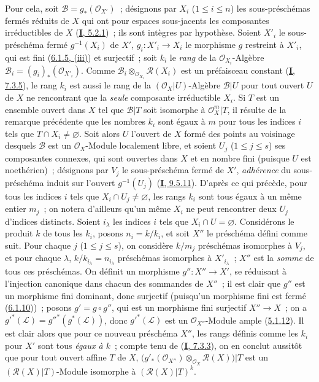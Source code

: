 Pour cela, soit $\mathcal{B}=g_*(\mathcal{O}_{X'})$~; désignons par $X_i$
($1\leq i\leq n$) les sous-préschémas fermés réduits de $X$ qui ont pour
espaces sous-jacents les composantes irréductibles de $X$
(\hyperref[I.5.2.1-fr]{\textbf{I}, 5.2.1})~; ils sont intègres par hypothèse. Soient
$X'_i$ le sous-préschéma fermé
$g^{-1}(X_i)$ de $X'$, $g_i:X'_i\to X_i$ le morphisme $g$ restreint à
$X'_i$, qui est fini (\hyperref[II.6.1.5-fr]{6.1.5, (iii)}) et surjectif~;
soit $k_i$ le \emph{rang} de la $\mathcal{O}_{X_i}$-Algèbre
$\mathcal{B}_i=(g_i)_*(\mathcal{O}_{X'_i})$. Comme
$\mathcal{B}_i\otimes_{\mathcal{O}_{X_i}}\mathcal{R}(X_i)$ est un
préfaisceau constant (\hyperref[I.7.3.5-fr]{\textbf{I}, 7.3.5}), le rang $k_i$ est
aussi le rang de la $(\mathcal{O}_X|U)$-Algèbre $\mathcal{B}|U$ pour tout
ouvert $U$ de $X$ ne rencontrant que la \emph{seule} composante irréductible
$X_i$. Si $T$ est un ensemble ouvert dans $X$ tel que $\mathcal{B}|T$ soit
isomorphe à $\mathcal{O}_X^m|T$, il résulte de la remarque précédente que les
nombres $k_i$ sont égaux à $m$ pour tous les indices $i$ tels que
$T\cap X_i\neq\varnothing$. Soit alors $U$ l'ouvert de $X$ formé des points
au voisinage desquels $\mathcal{B}$ est un $\mathcal{O}_X$-Module localement
libre, et soient $U_j$ ($1\leq j\leq s$) ses composantes connexes, qui sont
ouvertes dans $X$ et en nombre fini (puisque $U$ est noethérien)~; désignons
par $V_j$ le sous-préschéma fermé de $X'$, \emph{adhérence} du sous-préschéma
induit sur l'ouvert $g^{-1}(U_j)$
(\hyperref[I.9.5.11-fr]{\textbf{I}, 9.5.11}). D'après ce qui précède, pour tous les
indices $i$ tels que $X_i\cap U_j\neq\varnothing$, les rangs $k_i$ sont tous
égaux à un même entier $m_j$~; on notera d'ailleurs qu'un même $X_i$ ne peut
rencontrer deux $U_j$ d'indices distincts. Soient $i_\lambda$ les indices
$i$ tels que $X_i\cap U=\varnothing$. Considérons le produit $k$ de tous les
$k_i$, posons $n_i=k/k_i$, et soit $X''$ le préschéma défini comme suit.
Pour chaque $j$ ($1\leq j\leq s$), on considère $k/m_j$ préschémas
isomorphes à $V_j$, et pour chaque $\lambda$, $k/k_{i_\lambda}=n_{i_\lambda}$ préschémas
isomorphes à $X'_{i_\lambda}$~; $X''$ est la \emph{somme} de tous ces
préschémas. On définit un morphisme $g'':X''\to X'$, se réduisant à
l'injection canonique dans chacun des sommandes de $X''$~; il est clair que
$g''$ est un morphisme fini dominant, donc surjectif (puisqu'un morphisme
fini est fermé (\hyperref[II.6.1.10-fr]{6.1.10}))~; posons
$g'=g\circ g''$, qui est un morphisme fini surjectif $X''\to X$~; on a
${g'}^*(\mathcal{L})={g''}^*(g^*(\mathcal{L}))$, donc
${g'}^*(\mathcal{L})$ est un $\mathcal{O}_{X''}$-Module ample
(\hyperref[II.5.1.12-fr]{5.1.12}). Il est clair alors que pour ce nouveau
préschéma $X''$, les rangs définis comme les $k_i$ pour $X'$ sont tous
\emph{égaux à $k$}~; compte tenu de
(\hyperref[I.7.3.3-fr]{\textbf{I}, 7.3.3}), on en conclut aussitôt que pour tout ouvert
affine $T$ de $X$,
$\bigl(g'_*(\mathcal{O}_{X''})\otimes_{\mathcal{O}_X}\mathcal{R}(X)\bigr)|T$
est un $(\mathcal{R}(X)|T)$-Module isomorphe à
$(\mathcal{R}(X)|T)^k$.

